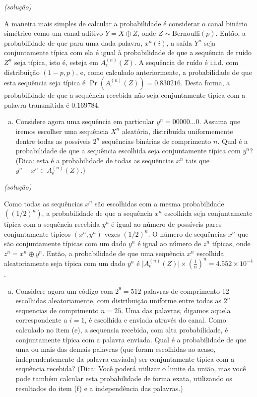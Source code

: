 \begin{frame}[allowframebreaks]
\begin{exercise}
  \examplebreak
  \textit{(solução)}

  A maneira mais simples de calcular a probabilidade é considerar o canal binário simétrico como
  um canal aditivo $Y=X \oplus Z$, onde $Z \sim \text{Bernoulli}(p)$. Então, a probabilidade
  de que para uma dada palavra, $x^n(i)$, a saída $Y^n$ seja conjuntamente típica com ela
  é igual à probabilidade de que a sequência de ruído $Z^n$ seja típica, isto é, esteja em
  $A_{\epsilon}^{(n)}(Z)$. A sequência de ruído é i.i.d. com distribuição $(1-p,p)$,
  e, como calculado anteriormente, a probabilidade de que esta sequência seja típica é
  $\Pr (A_{\epsilon}^{(n)}(Z)) = 0.830216$. Desta forma, a probabilidade de que a sequência
  recebida não seja conjuntamente típica com a palavra transmitida é $0.169784$.


  \examplebreak
  \begin{enumerate}[f)]
  \item Considere agora uma sequência em particular $y^n = 00000 \ldots 0$.
  Assuma que iremos escolher uma sequência $X^n$ aleatória, distribuída uniformemente
  dentre todas as possíveis $2^n$ sequências binárias de comprimento $n$.
  Qual é a probabilidade de que a sequência escolhida seja conjuntamente típica com $y^n$?
  (Dica: esta é a probabilidade de todas as sequências $x^n$ tais que $y^n - x^n \in A_{\epsilon}^{(n)}(Z)$.)
  \end{enumerate}

  \examplebreak
  \textit{(solução)}

  Como todas as sequências $x^n$ são escolhidas com a mesma probabilidade $((1/2)^n)$,
  a probabilidade de que a sequência $x^n$ escolhida seja conjuntamente típica com a 
  sequência recebida $y^n$ é igual ao número de possíveis pares conjuntamente típicos
  $(x^n, y^n)$ vezes $(1/2)^n$. O número de sequências $x^n$ que são conjuntamente 
  típicas com um dado $y^n$ é igual ao número de $z^n$ típicas, onde $z^n = x^n \oplus y^n$.
  Então, a probabilidade de que uma sequência $x^n$ escolhida aleatoriamente seja típica
  com um dado $y^n$ é 
  $\vert A_{\epsilon}^{(n)}(Z) \vert \times \left( \frac{1}{n} \right)^n = 4.552 \times 10^{-4}$.

  \examplebreak
  \begin{enumerate}[g)]
  \item Considere agora um código com $2^9 = 512$ palavras de comprimento 12
  escolhidas aleatoriamente, com distribuição uniforme entre todas as $2^n$ 
  sequencias de comprimento $n=25$. Uma das palavras, digamos aquela 
  correspondente a $i=1$, é escolhida e enviada através do canal. 
  Como calculado no item (e), a sequencia recebida, com alta probabilidade,
  é conjuntamente típica com a palavra enviada. Qual é a probabilidade de que
  uma ou mais das demais palavras (que foram escolhidas ao acaso, independentemente
  da palavra enviada) ser conjuntamente típica com a sequência recebida?
  (Dica: Você poderá utilizar o limite da união, mas você pode também calcular
  esta probabilidade de forma exata, utilizando os resultados do item (f) e 
  a independência das palavras.)
  \end{enumerate}


\end{exercise}
\end{frame}
